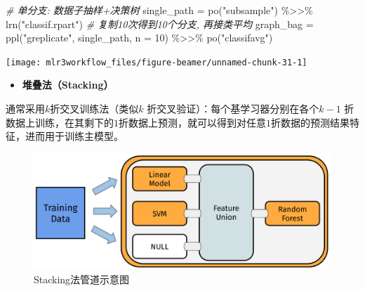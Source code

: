 \documentclass[
  11pt,
  ignorenonframetext,
  dvipsnames,UTF8]{beamer}
\newenvironment{Shaded}{\begin{snugshade}}{\end{snugshade}}
\newcommand{\AttributeTok}[1]{\textcolor[rgb]{0.77,0.63,0.00}{#1}}
\newcommand{\CommentTok}[1]{\textcolor[rgb]{0.56,0.35,0.01}{\textit{#1}}}
\newcommand{\DecValTok}[1]{\textcolor[rgb]{0.00,0.00,0.81}{#1}}
\newcommand{\FunctionTok}[1]{\textcolor[rgb]{0.00,0.00,0.00}{#1}}
\newcommand{\NormalTok}[1]{#1}
\newcommand{\OtherTok}[1]{\textcolor[rgb]{0.56,0.35,0.01}{#1}}
\newcommand{\SpecialCharTok}[1]{\textcolor[rgb]{0.00,0.00,0.00}{#1}}
\newcommand{\StringTok}[1]{\textcolor[rgb]{0.31,0.60,0.02}{#1}}
\providecommand{\tightlist}{%
  \setlength{\itemsep}{0pt}\setlength{\parskip}{0pt}}
\begin{document}
\begin{frame}[fragile]{}
\protect\hypertarget{section-21}{}
\begin{Shaded}
\begin{Highlighting}[]
\CommentTok{\# 单分支: 数据子抽样+决策树}
\NormalTok{single\_path }\OtherTok{=} \FunctionTok{po}\NormalTok{(}\StringTok{"subsample"}\NormalTok{) }\SpecialCharTok{\%\textgreater{}\textgreater{}\%} \FunctionTok{lrn}\NormalTok{(}\StringTok{"classif.rpart"}\NormalTok{)}
\CommentTok{\# 复制10次得到10个分支, 再接类平均}
\NormalTok{graph\_bag }\OtherTok{=} \FunctionTok{ppl}\NormalTok{(}\StringTok{"greplicate"}\NormalTok{, single\_path, }\AttributeTok{n =} \DecValTok{10}\NormalTok{) }\SpecialCharTok{\%\textgreater{}\textgreater{}\%}
  \FunctionTok{po}\NormalTok{(}\StringTok{"classifavg"}\NormalTok{) }
\end{Highlighting}
\end{Shaded}
\end{frame}

\begin{frame}[fragile]{}
\protect\hypertarget{section-22}{}
\begin{Shaded}
\end{Shaded}

\begin{center}\texttt{[image: mlr3workflow\_files/figure-beamer/unnamed-chunk-31-1]} \end{center}
\end{frame}

\begin{frame}{}
\protect\hypertarget{section-23}{}
\begin{itemize}
\tightlist
\item
  \textbf{堆叠法（Stacking）}
\end{itemize}

通常采用\(k\)折交叉训练法（类似\(k\)
折交叉验证）：每个基学习器分别在各个\(k-1\)
折数据上训练，在其剩下的\(1\)折数据上预测，就可以得到对任意\(1\)折数据的预测结果特征，进而用于训练主模型。

\begin{figure}

{\centering \includegraphics[width=0.65\linewidth]{images/stacking} 

}

\caption{Stacking法管道示意图}\label{fig:unnamed-chunk-32}
\end{figure}
\end{frame}
\end{document}
